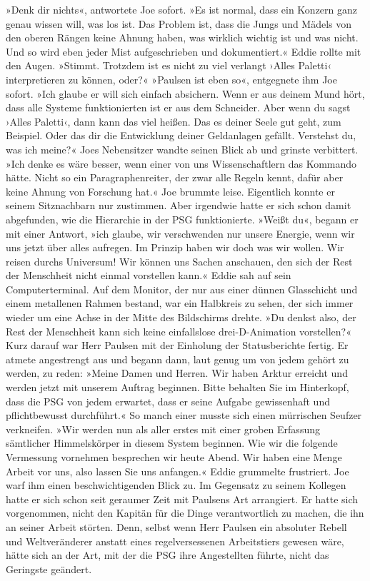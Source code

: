 »Denk dir nichts«, antwortete Joe sofort. »Es ist normal, dass ein Konzern ganz genau wissen will, was los ist. Das Problem ist, dass die Jungs und Mädels von den oberen Rängen keine Ahnung haben, was wirklich wichtig ist und was nicht. Und so wird eben jeder Mist aufgeschrieben und dokumentiert.«
Eddie rollte mit den Augen. »Stimmt. Trotzdem ist es nicht zu viel verlangt ›Alles Paletti‹ interpretieren zu können, oder?«
»Paulsen ist eben so«, entgegnete ihm Joe sofort. »Ich glaube er will sich einfach absichern. Wenn er aus deinem Mund hört, dass alle Systeme funktionierten ist er aus dem Schneider. Aber wenn du sagst ›Alles Paletti‹, dann kann das viel heißen. Das es deiner Seele gut geht, zum Beispiel. Oder das dir die Entwicklung deiner Geldanlagen gefällt. Verstehst du, was ich meine?«
Joes Nebensitzer wandte seinen Blick ab und grinste verbittert. »Ich denke es wäre besser, wenn einer von uns Wissenschaftlern das Kommando hätte. Nicht so ein Paragraphenreiter, der zwar alle Regeln kennt, dafür aber keine Ahnung von Forschung hat.«
Joe brummte leise. Eigentlich konnte er seinem Sitznachbarn nur zustimmen. Aber irgendwie hatte er sich schon damit abgefunden, wie die Hierarchie in der PSG funktionierte.
»Weißt du«, begann er mit einer Antwort, »ich glaube, wir verschwenden nur unsere Energie, wenn wir uns jetzt über alles aufregen. Im Prinzip haben wir doch was wir wollen. Wir reisen durchs Universum! Wir können uns Sachen anschauen, den sich der Rest der Menschheit nicht einmal vorstellen kann.«
Eddie sah auf sein Computerterminal. Auf dem Monitor, der nur aus einer dünnen Glasschicht und einem metallenen Rahmen bestand, war ein Halbkreis zu sehen, der sich immer wieder um eine Achse in der Mitte des Bildschirms drehte.
»Du denkst also, der Rest der Menschheit kann sich keine einfallslose drei-D-Animation vorstellen?«
Kurz darauf war Herr Paulsen mit der Einholung der Statusberichte fertig. Er atmete angestrengt aus und begann dann, laut genug um von jedem gehört zu werden, zu reden: »Meine Damen und Herren. Wir haben Arktur erreicht und werden jetzt mit unserem Auftrag beginnen. Bitte behalten Sie im Hinterkopf, dass die PSG von jedem erwartet, dass er seine Aufgabe gewissenhaft und pflichtbewusst durchführt.« So manch einer musste sich einen mürrischen Seufzer verkneifen. »Wir werden nun als aller erstes mit einer groben Erfassung sämtlicher Himmelskörper in diesem System beginnen. Wie wir die folgende Vermessung vornehmen besprechen wir heute Abend. Wir haben eine Menge Arbeit vor uns, also lassen Sie uns anfangen.«
Eddie grummelte frustriert. Joe warf ihm einen beschwichtigenden Blick zu. Im Gegensatz zu seinem Kollegen hatte er sich schon seit geraumer Zeit mit Paulsens Art arrangiert. Er hatte sich vorgenommen, nicht den Kapitän für die Dinge verantwortlich zu machen, die ihn an seiner Arbeit störten. Denn, selbst wenn Herr Paulsen ein absoluter Rebell und Weltveränderer anstatt eines regelversessenen Arbeitstiers gewesen wäre, hätte sich an der Art, mit der die PSG ihre Angestellten führte, nicht das Geringste geändert.
